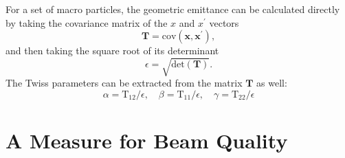 For a set of macro particles, the geometric emittance can be calculated directly by taking the covariance matrix of the $x$ and $x^{\prime}$ vectors
\begin{equation}
    \mathbf{T} = \mathrm{cov}\left(\mathbf{x}, \mathbf{x}^{\prime}\right), \label{EQ:ECalc1}
\end{equation}
and then taking the square root of its determinant
\begin{equation}
    \epsilon = \sqrt{\mathrm{det}\left(\mathbf{T}\right)}. \label{EQ:ECalc2}
\end{equation}
The Twiss parameters can be extracted from the matrix $\mathbf{T}$ as well:
\begin{equation}
    \alpha = \mathrm{T}_{12}/\epsilon, \quad
    \beta  = \mathrm{T}_{11}/\epsilon, \quad
    \gamma = \mathrm{T}_{22}/\epsilon
\end{equation}

\section{A Measure for Beam Quality}
\label{SimA:QTilde}

